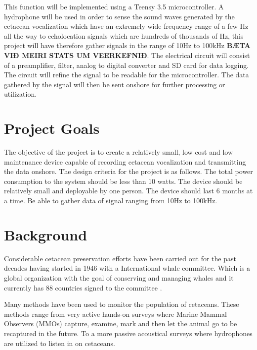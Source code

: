 This function will be implemented using a Teensy 3.5 microcontroller.
A hydrophone will be used in order to sense the sound waves generated by the cetacean vocalization which have an extremely wide frequency range of a few Hz all the way to echolocation signals which are hundreds of thousands of Hz, this project will have therefore gather signals in the range of 10Hz to 100kHz \textbf{BÆTA VIÐ MEIRI STATS UM VEERKEFNIÐ}.
The electrical circuit will consist of a preamplifier, filter, analog to digital converter and SD card for data logging.
The circuit will refine the signal to be readable for the microcontroller. 
The data gathered by the signal will then be sent onshore for further processing or utilization.


\section{Project Goals}

The objective of the project is to create a relatively small, low cost and low maintenance device capable of recording cetacean vocalization and transmitting the data onshore.
The design criteria for the project is as follows.
The total power consumption to the system should be less than 10 watts. 
The device should be relatively small and deployable by one person.
The device should last 6 months at a time.
Be able to gather data of signal ranging from 10Hz to 100kHz.


\section{Background}

Considerable cetacean preservation efforts have been carried out for the past decades having started in 1946 with a International whale committee.
Which is a global organization with the goal of conserving and managing whales and it currently has 88 countries signed to the committee \cite{noauthor_iwc_nodate}.

Many methods have been used to monitor the population of cetaceans.
These methods range from very active hands-on surveys where Marine Mammal Observers (MMOs) capture, examine, mark and then let the animal go to be recaptured in the future.
To a more passive acoustical surveys where hydrophones are utilized to listen in on cetaceans.


